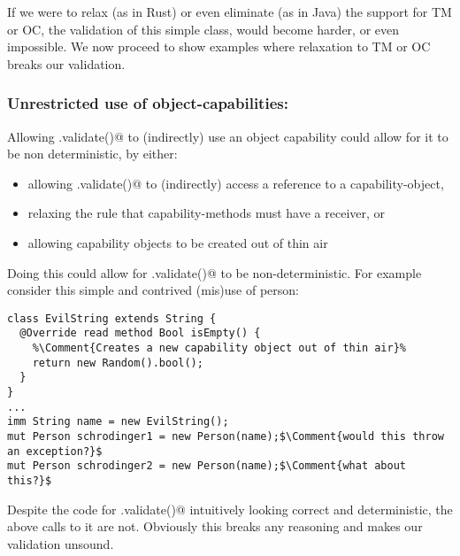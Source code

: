 
If we were to relax (as in Rust) or even eliminate (as in Java) the support for TM or OC, the validation of this simple \Q@Person@ class, would become harder, or even impossible. We now proceed to show examples where
relaxation to TM or OC breaks our validation. 
\subsubsection*{Unrestricted use of object-capabilities:}
Allowing \Q@.validate()@ to (indirectly) use an object capability could allow for it to be non deterministic, by either:
\begin{itemize}
\item allowing \Q@.validate()@ to (indirectly) access a \Q@mut@ reference to a capability-object,
\item relaxing the rule that capability-methods must have a \Q@mut@ receiver, or
\item allowing capability objects to be created out of thin air
\end{itemize}

Doing this could allow for \Q@.validate()@ to be non-deterministic. For example consider this simple and contrived (mis)use of person:
\begin{lstlisting}[escapechar=\%]
class EvilString extends String {
  @Override read method Bool isEmpty() {
    %\Comment{Creates a new capability object out of thin air}%
    return new Random().bool();
  }
}
...
imm String name = new EvilString();
mut Person schrodinger1 = new Person(name);$\Comment{would this throw an exception?}$
mut Person schrodinger2 = new Person(name);$\Comment{what about this?}$
\end{lstlisting}
Despite the code for \Q@Persion.validate()@ intuitively looking correct and deterministic, the above calls to it are not. Obviously this breaks any reasoning and makes our validation unsound. 

